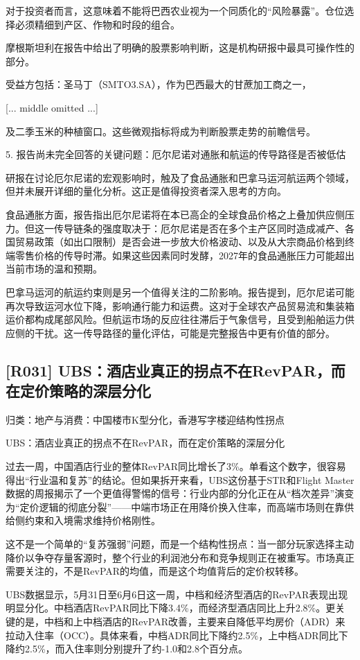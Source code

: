 \documentclass[11pt]{ctexart}
\begin{document}
对于投资者而言，这意味着不能将巴西农业视为一个同质化的“风险暴露”。仓位选择必须精细到产区、作物和时段的组合。

摩根斯坦利在报告中给出了明确的股票影响判断，这是机构研报中最具可操作性的部分。

受益方包括：圣马丁（SMTO3.SA），作为巴西最大的甘蔗加工商之一，

[... middle omitted ...]

及二季玉米的种植窗口。这些微观指标将成为判断股票走势的前瞻信号。

5. 报告尚未完全回答的关键问题：厄尔尼诺对通胀和航运的传导路径是否被低估

研报在讨论厄尔尼诺的宏观影响时，触及了食品通胀和巴拿马运河航运两个领域，但并未展开详细的量化分析。这正是值得投资者深入思考的方向。

食品通胀方面，报告指出厄尔尼诺将在本已高企的全球食品价格之上叠加供应侧压力。但这一传导链条的强度取决于：厄尔尼诺是否在多个主产区同时造成减产、各国贸易政策（如出口限制）是否会进一步放大价格波动、以及从大宗商品价格到终端零售价格的传导时滞。如果这些因素同时发酵，2027年的食品通胀压力可能超出当前市场的温和预期。

巴拿马运河的航运约束则是另一个值得关注的二阶影响。报告提到，厄尔尼诺可能再次导致运河水位下降，影响通行能力和运费。这对于全球农产品贸易流和集装箱运价都构成尾部风险。但航运市场的反应往往滞后于气象信号，且受到船舶运力供应侧的干扰。这一传导路径的量化评估，可能是完整报告中更有价值的部分。

\subsection{[R031] UBS：酒店业真正的拐点不在RevPAR，而在定价策略的深层分化}
{\small\color{refgray}归类：地产与消费：中国楼市K型分化，香港写字楼迎结构性拐点}

UBS：酒店业真正的拐点不在RevPAR，而在定价策略的深层分化

过去一周，中国酒店行业的整体RevPAR同比增长了3\%。单看这个数字，很容易得出“行业温和复苏”的结论。但如果拆开来看，UBS这份基于STR和Flight Master数据的周报揭示了一个更值得警惕的信号：行业内部的分化正在从“档次差异”演变为“定价逻辑的彻底分裂”——中端市场正在用降价换入住率，而高端市场则在靠供给侧约束和入境需求维持价格刚性。

这不是一个简单的“复苏强弱”问题，而是一个结构性拐点：当一部分玩家选择主动降价以争夺存量客源时，整个行业的利润池分布和竞争规则正在被重写。市场真正需要关注的，不是RevPAR的均值，而是这个均值背后的定价权转移。

UBS数据显示，5月31日至6月6日这一周，中档和经济型酒店的RevPAR表现出现明显分化。中档酒店RevPAR同比下降3.4\%，而经济型酒店同比上升2.8\%。更关键的是，中档和上中档酒店的RevPAR改善，主要来自降低平均房价（ADR）来拉动入住率（OCC）。具体来看，中档ADR同比下降约2.5\%，上中档ADR同比下降约2.5\%，而入住率则分别提升了约-1.0和2.8个百分点。
\end{document}
